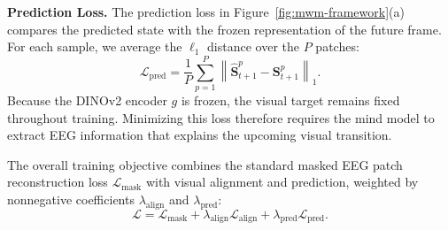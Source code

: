 \noindent\textbf{Prediction Loss.}
The prediction loss in Figure~\ref{fig:mwm-framework}(a) compares the predicted state with the frozen representation of the future frame. For each sample, we average the $\ell_1$ distance over the $P$ patches:
\begin{equation}
    \mathcal{L}_{\mathrm{pred}}
    =
    \frac{1}{P}
    \sum_{p=1}^{P}
    \left\|
    \hat{\mathbf{S}}_{t+1}^{p}
    -
    \mathbf{S}_{t+1}^{p}
    \right\|_1.
\end{equation}
Because the DINOv2 encoder $g$ is frozen, the visual target remains fixed throughout training. Minimizing this loss therefore requires the mind model to extract EEG information that explains the upcoming visual transition.

The overall training objective combines the standard masked EEG patch reconstruction loss $\mathcal{L}_{\mathrm{mask}}$ with visual alignment and prediction, weighted by nonnegative coefficients $\lambda_{\mathrm{align}}$ and $\lambda_{\mathrm{pred}}$:
\begin{equation}
    \mathcal{L}
    =
    \mathcal{L}_{\mathrm{mask}}
    +
    \lambda_{\mathrm{align}}\mathcal{L}_{\mathrm{align}}
    +
    \lambda_{\mathrm{pred}}\mathcal{L}_{\mathrm{pred}}.
\end{equation}
